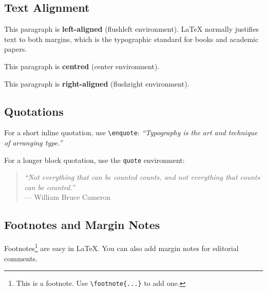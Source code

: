 \documentclass[12pt, a4paper]{article}
\theoremstyle{definition}
\theoremstyle{plain}
\theoremstyle{remark}
\begin{document}
\subsection{Text Alignment}

\begin{flushleft}
  This paragraph is \textbf{left-aligned} (flushleft environment).
  \LaTeX{} normally justifies text to both margins, which is the typographic
  standard for books and academic papers.
\end{flushleft}

\begin{center}
  This paragraph is \textbf{centred} (center environment).
\end{center}

\begin{flushright}
  This paragraph is \textbf{right-aligned} (flushright environment).
\end{flushright}

\subsection{Quotations}

For a short inline quotation, use \texttt{\textbackslash enquote}:
\textit{``Typography is the art and technique of arranging type.''}

For a longer block quotation, use the \texttt{quote} environment:

\begin{quote}
  \textit{%
    ``Not everything that can be counted counts, and not everything that
    counts can be counted.''}\\
  \hfill --- William Bruce Cameron
\end{quote}

\subsection{Footnotes and Margin Notes}

Footnotes\footnote{This is a footnote. Use \texttt{\textbackslash footnote\{...\}}
to add one.} are easy in \LaTeX{}.  You can also add margin
notes for editorial comments.

\end{document}
